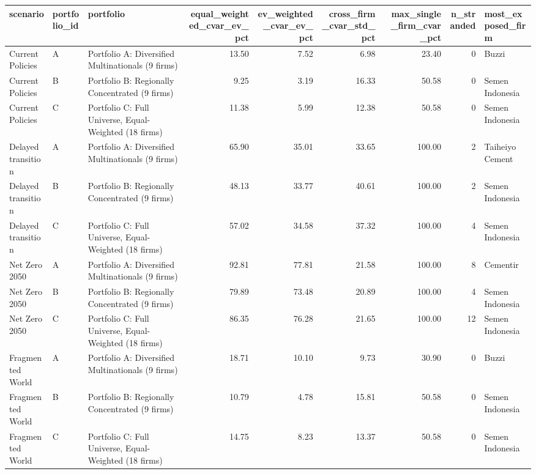 \begin{tabular}{lllrrrrrl}
\toprule
scenario & portfolio_id & portfolio & equal_weighted_cvar_ev_pct & ev_weighted_cvar_ev_pct & cross_firm_cvar_std_pct & max_single_firm_cvar_pct & n_stranded & most_exposed_firm \\
\midrule
Current Policies & A & Portfolio A: Diversified Multinationals (9 firms) & 13.50 & 7.52 & 6.98 & 23.40 & 0 & Buzzi \\
Current Policies & B & Portfolio B: Regionally Concentrated (9 firms) & 9.25 & 3.19 & 16.33 & 50.58 & 0 & Semen Indonesia \\
Current Policies & C & Portfolio C: Full Universe, Equal-Weighted (18 firms) & 11.38 & 5.99 & 12.38 & 50.58 & 0 & Semen Indonesia \\
Delayed transition & A & Portfolio A: Diversified Multinationals (9 firms) & 65.90 & 35.01 & 33.65 & 100.00 & 2 & Taiheiyo Cement \\
Delayed transition & B & Portfolio B: Regionally Concentrated (9 firms) & 48.13 & 33.77 & 40.61 & 100.00 & 2 & Semen Indonesia \\
Delayed transition & C & Portfolio C: Full Universe, Equal-Weighted (18 firms) & 57.02 & 34.58 & 37.32 & 100.00 & 4 & Semen Indonesia \\
Net Zero 2050 & A & Portfolio A: Diversified Multinationals (9 firms) & 92.81 & 77.81 & 21.58 & 100.00 & 8 & Cementir \\
Net Zero 2050 & B & Portfolio B: Regionally Concentrated (9 firms) & 79.89 & 73.48 & 20.89 & 100.00 & 4 & Semen Indonesia \\
Net Zero 2050 & C & Portfolio C: Full Universe, Equal-Weighted (18 firms) & 86.35 & 76.28 & 21.65 & 100.00 & 12 & Semen Indonesia \\
Fragmented World & A & Portfolio A: Diversified Multinationals (9 firms) & 18.71 & 10.10 & 9.73 & 30.90 & 0 & Buzzi \\
Fragmented World & B & Portfolio B: Regionally Concentrated (9 firms) & 10.79 & 4.78 & 15.81 & 50.58 & 0 & Semen Indonesia \\
Fragmented World & C & Portfolio C: Full Universe, Equal-Weighted (18 firms) & 14.75 & 8.23 & 13.37 & 50.58 & 0 & Semen Indonesia \\
\bottomrule
\end{tabular}
